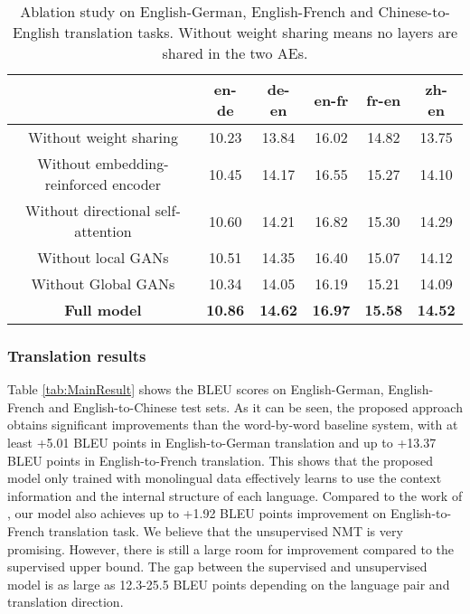 \documentclass[11pt,a4paper]{article}
\begin{document}
\begin{table*}[htb]
			\centering
				\begin{tabular}{c|ccccc}
					\toprule[2pt]
					 & en-de	& de-en	&	en-fr &   fr-en & zh-en\\
					\midrule[1pt]
					Without weight sharing  &  10.23     &  13.84  &     16.02    & 14.82  & 13.75    \\
                    Without embedding-reinforced encoder  &  10.45  &  14.17  & 16.55  & 15.27 & 14.10     \\
					Without directional self-attention  &   10.60 & 14.21  &  16.82   &  15.30  &  14.29     \\
                    Without local GANs &  10.51     &   14.35      &   16.40          &  15.07    &  14.12   \\
                    Without Global GANs  &    10.34   &  14.05       &  16.19         &  15.21    &  14.09   \\
                    \textbf{Full model}&\textbf{10.86}&\textbf{14.62}&\textbf{16.97}&\textbf{15.58}&\textbf{14.52}    \\
					\bottomrule[2pt]
				\end{tabular}
				\caption{\label{tab:Ablation} Ablation study on English-German, English-French and Chinese-to-English translation tasks. Without weight sharing means no layers are shared in the two AEs.}
\end{table*}

\subsubsection{Translation results}
Table \ref{tab:MainResult} shows the BLEU scores on English-German, English-French and English-to-Chinese test sets. As it can be seen, the proposed approach obtains significant improvements than the word-by-word baseline system, with at least +5.01 BLEU points in English-to-German translation and up to +13.37 BLEU points in English-to-French translation. This shows that the proposed model only trained with monolingual data effectively learns to use the context information and the internal structure of each language. Compared to the work of \cite{Lample2017Unsupervised}, our model also achieves up to +1.92 BLEU points improvement on English-to-French translation task. We believe that the unsupervised NMT is very promising. However, there is still a large room for improvement compared to the supervised upper bound. The gap between the supervised and unsupervised model is as large as 12.3-25.5 BLEU points depending on the language pair and translation direction.
\end{document}
